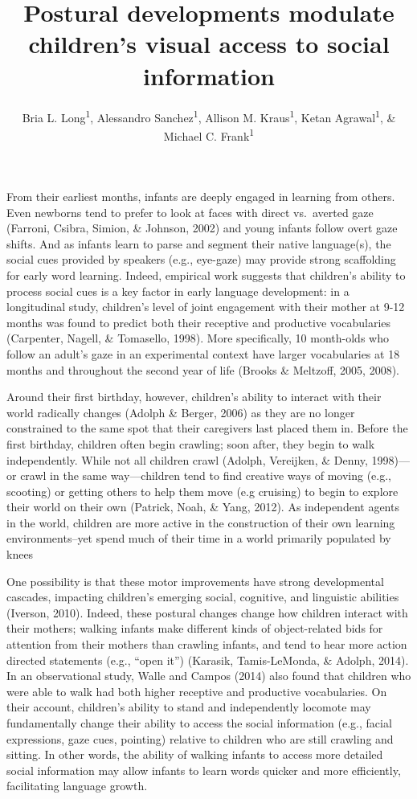 \documentclass[english,man]{apa6}
\author{Bria L. Long\textsuperscript{1}, Alessandro Sanchez\textsuperscript{1}, Allison M. Kraus\textsuperscript{1}, Ketan Agrawal\textsuperscript{1}, \& Michael C. Frank\textsuperscript{1}}
\affiliation{
\vspace{0.5cm}
\textsuperscript{1} Department of Psychology, Stanford University}
\title{Postural developments modulate children's visual access to social
information}
\date{}
\begin{document}
\maketitle

From their earliest months, infants are deeply engaged in learning from
others. Even newborns tend to prefer to look at faces with direct
vs.~averted gaze (Farroni, Csibra, Simion, \& Johnson, 2002) and young
infants follow overt gaze shifts. And as infants learn to parse and
segment their native language(s), the social cues provided by speakers
(e.g., eye-gaze) may provide strong scaffolding for early word learning.
Indeed, empirical work suggests that children's ability to process
social cues is a key factor in early language development: in a
longitudinal study, children's level of joint engagement with their
mother at 9-12 months was found to predict both their receptive and
productive vocabularies (Carpenter, Nagell, \& Tomasello, 1998). More
specifically, 10 month-olds who follow an adult's gaze in an
experimental context have larger vocabularies at 18 months and
throughout the second year of life (Brooks \& Meltzoff, 2005, 2008).

Around their first birthday, however, children's ability to interact
with their world radically changes (Adolph \& Berger, 2006) as they are
no longer constrained to the same spot that their caregivers last placed
them in. Before the first birthday, children often begin crawling; soon
after, they begin to walk independently. While not all children crawl
(Adolph, Vereijken, \& Denny, 1998)---or crawl in the same
way---children tend to find creative ways of moving (e.g., scooting) or
getting others to help them move (e.g cruising) to begin to explore
their world on their own (Patrick, Noah, \& Yang, 2012). As independent
agents in the world, children are more active in the construction of
their own learning environments--yet spend much of their time in a world
primarily populated by knees

One possibility is that these motor improvements have strong
developmental cascades, impacting children's emerging social, cognitive,
and linguistic abilities (Iverson, 2010). Indeed, these postural changes
change how children interact with their mothers; walking infants make
different kinds of object-related bids for attention from their mothers
than crawling infants, and tend to hear more action directed statements
(e.g., \enquote{open it}) (Karasik, Tamis-LeMonda, \& Adolph, 2014). In
an observational study, Walle and Campos (2014) also found that children
who were able to walk had both higher receptive and productive
vocabularies. On their account, children's ability to stand and
independently locomote may fundamentally change their ability to access
the social information (e.g., facial expressions, gaze cues, pointing)
relative to children who are still crawling and sitting. In other words,
the ability of walking infants to access more detailed social
information may allow infants to learn words quicker and more
efficiently, facilitating language growth.
\end{document}
